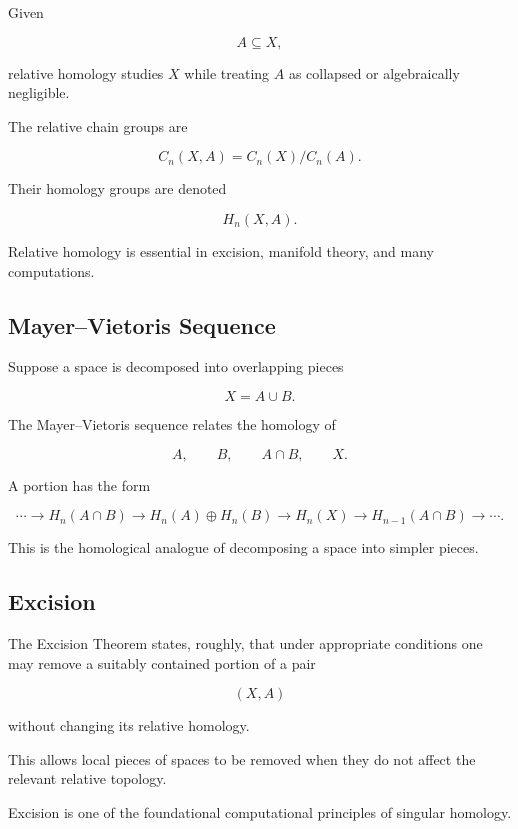 Given

\[
A\subseteq X,
\]

relative homology studies \(X\) while treating \(A\) as collapsed or
algebraically negligible.

The relative chain groups are

\[
\boxed{
C_n(X,A)
=
C_n(X)/C_n(A).
}
\]

Their homology groups are denoted

\[
\boxed{
H_n(X,A).
}
\]

Relative homology is essential in excision, manifold theory, and many
computations.

\subsection{Mayer--Vietoris Sequence}
\label{subsec:mayer-vietoris}

Suppose a space is decomposed into overlapping pieces

\[
X=A\cup B.
\]

The Mayer--Vietoris sequence relates the homology of

\[
A,
\qquad
B,
\qquad
A\cap B,
\qquad
X.
\]

A portion has the form

\[
\boxed{
\cdots
\to
H_n(A\cap B)
\to
H_n(A)\oplus H_n(B)
\to
H_n(X)
\to
H_{n-1}(A\cap B)
\to
\cdots.
}
\]

This is the homological analogue of decomposing a space into simpler pieces.

\subsection{Excision}
\label{subsec:excision-topology}

The Excision Theorem states, roughly, that under appropriate conditions one
may remove a suitably contained portion of a pair

\[
(X,A)
\]

without changing its relative homology.

This allows local pieces of spaces to be removed when they do not affect the
relevant relative topology.

Excision is one of the foundational computational principles of singular
homology.

